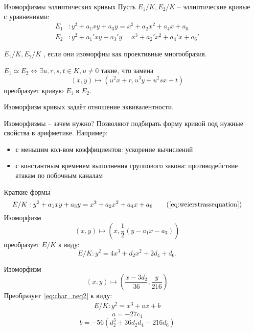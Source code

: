 \documentclass{beamer}
\begin{document}
\begin{frame}{Изоморфизмы эллиптических кривых}
Пусть $E_1/K, E_2/K$ -- эллиптические кривые с уравнениями:
\begin{equation}
\begin{split}
E_1&: y^2+a_1xy + a_3y = x^3 + a_2x^2 + a_4x + a_6 \\
E_2&: y^2+a_1'xy + a_3'y = x^3 + a_2'x^2 + a_4'x + a_6'
\end{split}
\end{equation}
    
$E_1/K, E_2/K$ , если они изоморфны как проективные многообразия.%

\begin{tcolorbox}[colframe=title-and-section-color!120, colback=title-and-section-color!5, title=Теорема, center title]
$E_1 \simeq E_2 \iff \exists u,r,s,t \in K, u \neq 0$ такие, что замена
\begin{equation}
    \label{eq:isom}
    (x,y) \mapsto (u^2x+r, u^3y+ u^2sx+t)
\end{equation}
преобразует кривую $E_1$ в $E_2$.
\end{tcolorbox}

Изоморфизм кривых задаёт отношение эквивалентности.
\end{frame}

\begin{frame}{Изоморфизмы -- зачем нужно?}
    Позволяют подбирать форму кривой под нужные свойства в арифметике. Например:
    \begin{itemize}
        \item с меньшим кол-вом коэффициентов: ускорение вычислений 
        \item с константным временем выполнения группового закона: противодействие атакам по побочным каналам
    \end{itemize}
\end{frame}

\begin{frame}{Краткие формы}
    \begin{equation*}
        E/K: y^2 + a_1 xy + a_3 y = x^3 + a_2 x^2 + a_4 x + a_6 \tag{\ref{eq:weierstrassequation}}
    \end{equation*}
    Изоморфизм \[(x, y)\mapsto \left(x, \frac{1}{2}(y-a_1x-a_3)\right)\] преобразует $E/K$ к виду:
    \begin{equation}
        \label{eq:char_neq2}
        E/K: y^2 = 4x^3 + d_2x^2 + 2d_4 + d_6.
    \end{equation}
    
    Изоморфизм
    \[
    (x, y) \mapsto \left(\frac{x-3d_2}{36}, \frac{y}{216}\right)
    \]
    Преобразует~\eqref{eq:char_neq2} к виду:
    \begin{align}
        E/K: y^2 = x^3 + ax + b
    \end{align}
    \[
    a = -27 c_4
    \]
    \[
    b = -56(d_2^3 + 36 d_2 d_4 - 216 d_6) 
    \]
\end{frame}
\end{document}
